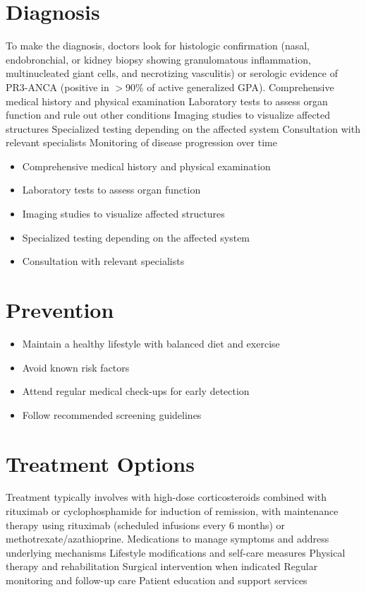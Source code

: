 \section{Diagnosis}
To make the diagnosis, doctors look for histologic confirmation (nasal, endobronchial, or kidney biopsy showing granulomatous inflammation, multinucleated giant cells, and necrotizing vasculitis) or serologic evidence of PR3-ANCA (positive in $>$90\% of active generalized GPA). Comprehensive medical history and physical examination Laboratory tests to assess organ function and rule out other conditions Imaging studies to visualize affected structures Specialized testing depending on the affected system Consultation with relevant specialists Monitoring of disease progression over time

\begin{itemize}[noitemsep]
  \item Comprehensive medical history and physical examination
  \item Laboratory tests to assess organ function
  \item Imaging studies to visualize affected structures
  \item Specialized testing depending on the affected system
  \item Consultation with relevant specialists
\end{itemize}
\section{Prevention}
\begin{itemize}[noitemsep]
  \item Maintain a healthy lifestyle with balanced diet and exercise
  \item Avoid known risk factors
  \item Attend regular medical check-ups for early detection
  \item Follow recommended screening guidelines
\end{itemize}
\section{Treatment Options}
Treatment typically involves with high-dose corticosteroids combined with rituximab or cyclophosphamide for induction of remission, with maintenance therapy using rituximab (scheduled infusions every 6 months) or methotrexate/azathioprine. Medications to manage symptoms and address underlying mechanisms Lifestyle modifications and self-care measures Physical therapy and rehabilitation Surgical intervention when indicated Regular monitoring and follow-up care Patient education and support services


